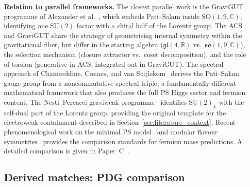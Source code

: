 \documentclass[11pt,a4paper]{article}
\theoremstyle{plain}
\theoremstyle{definition}
\theoremstyle{remark}
\begin{document}
\textbf{Relation to parallel frameworks.}
The closest parallel work is the GraviGUT programme of Alexander
et al.~\cite{Alexander2025}, which embeds Pati--Salam inside
$\mathrm{SO}(1,9,\mathbb{C})$, identifying one $\mathrm{SU}(2)$
factor with a chiral half of the Lorentz group.  The ACS and GraviGUT
share the strategy of geometrising internal symmetry within the
gravitational fiber, but differ in the starting algebra
($\mathfrak{gl}(4,\mathbb{R})$ vs.\
$\mathfrak{so}(1,9,\mathbb{C})$), the selection mechanism
(closure attractor vs.\ coset decomposition), and the role of
torsion (generative in ACS, integrated out in GraviGUT).
The spectral approach of Chamseddine, Connes, and van
Suijlekom~\cite{ChamseddineConnes2015} derives the Pati--Salam gauge
group from a noncommutative spectral triple, a fundamentally different
mathematical framework that also produces the full PS Higgs sector
and fermion content.  The Nesti--Percacci
graviweak programme~\cite{NestiPercacci2008} identifies
$\mathrm{SU}(2)_L$ with the self-dual part of the Lorentz group,
providing the original template for the electroweak containment
described in Section~\ref{sec:literature_context}.
Recent phenomenological work on the minimal PS
model~\cite{MinimalPS2025} and modular flavour
symmetries~\cite{Belfkir2025} provides the comparison standards
for fermion mass predictions.
A detailed comparison is given in Paper~C~\cite{Wallace2026c}.

\subsection*{Derived matches: PDG comparison}
\label{sec:pdg-comparison}
\end{document}
